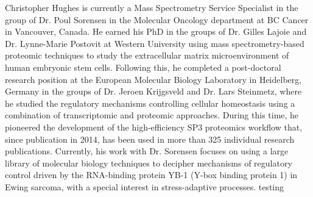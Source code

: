 \documentclass[11pt]{article}
\begin{document}
\noindent 
Christopher Hughes is currently a Mass Spectrometry Service Specialist in the group of Dr. Poul Sorensen in the Molecular Oncology department at BC Cancer in Vancouver, Canada. He earned his PhD in the groups of Dr. Gilles Lajoie and Dr. Lynne-Marie Postovit at Western University using mass spectrometry-based proteomic techniques to study the extracellular matrix microenvironment of human embryonic stem cells. Following this, he completed a post-doctoral research position at the European Molecular Biology Laboratory in Heidelberg, Germany in the groups of Dr. Jeroen Krijgsveld and Dr. Lars Steinmetz, where he studied the regulatory mechanisms controlling cellular homeostasis using a combination of transcriptomic and proteomic approaches. During this time, he pioneered the development of the high-efficiency SP3 proteomics workflow that, since publication in 2014, has been used in more than 325 individual research publications. Currently, his work with Dr. Sorensen focuses on using a large library of molecular biology techniques to decipher mechanisms of regulatory control driven by the RNA-binding protein YB-1 (Y-box binding protein 1) in Ewing sarcoma, with a special interest in stress-adaptive processes. testing  
\end{document}
